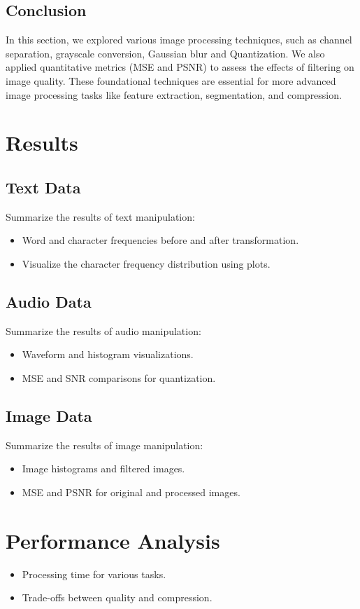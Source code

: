 \documentclass[a4paper,12pt]{article}
\begin{document}
\subsection{Conclusion}
In this section, we explored various image processing techniques, such as channel separation, grayscale conversion, Gaussian blur and Quantization. We also applied quantitative metrics (MSE and PSNR) to assess the effects of filtering on image quality. These foundational techniques are essential for more advanced image processing tasks like feature extraction, segmentation, and compression.



\section{Results}
\subsection{Text Data}
Summarize the results of text manipulation:
\begin{itemize}
    \item Word and character frequencies before and after transformation.
    \item Visualize the character frequency distribution using plots.
\end{itemize}

\subsection{Audio Data}
Summarize the results of audio manipulation:
\begin{itemize}
    \item Waveform and histogram visualizations.
    \item MSE and SNR comparisons for quantization.
\end{itemize}

\subsection{Image Data}
Summarize the results of image manipulation:
\begin{itemize}
    \item Image histograms and filtered images.
    \item MSE and PSNR for original and processed images.
\end{itemize}

\section{Performance Analysis}
\begin{itemize}
    \item Processing time for various tasks.
    \item Trade-offs between quality and compression.
\end{itemize}
\end{document}
